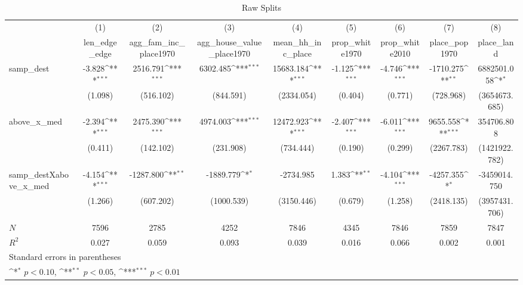 \begin{table}[htbp]\centering
\def\sym#1{\ifmmode^{#1}\else\(^{#1}\)\fi}
\caption{Raw Splits}
\begin{tabular}{l*{8}{c}}
\hline\hline
            &\multicolumn{1}{c}{(1)}&\multicolumn{1}{c}{(2)}&\multicolumn{1}{c}{(3)}&\multicolumn{1}{c}{(4)}&\multicolumn{1}{c}{(5)}&\multicolumn{1}{c}{(6)}&\multicolumn{1}{c}{(7)}&\multicolumn{1}{c}{(8)}\\
            &\multicolumn{1}{c}{len\_edge\_edge}&\multicolumn{1}{c}{agg\_fam\_inc\_place1970}&\multicolumn{1}{c}{agg\_house\_value\_place1970}&\multicolumn{1}{c}{mean\_hh\_inc\_place}&\multicolumn{1}{c}{prop\_white1970}&\multicolumn{1}{c}{prop\_white2010}&\multicolumn{1}{c}{place\_pop1970}&\multicolumn{1}{c}{place\_land}\\
\hline
samp\_dest   &      -3.828\sym{***}&    2516.791\sym{***}&    6302.485\sym{***}&   15683.184\sym{***}&      -1.125\sym{***}&      -4.746\sym{***}&   -1710.275\sym{**} & 6882501.058\sym{*}  \\
            &     (1.098)         &   (516.102)         &   (844.591)         &  (2334.054)         &     (0.404)         &     (0.771)         &   (728.968)         &(3654673.685)         \\
[1em]
above\_x\_med &      -2.394\sym{***}&    2475.390\sym{***}&    4974.003\sym{***}&   12472.923\sym{***}&      -2.407\sym{***}&      -6.011\sym{***}&    9655.558\sym{***}&  354706.808         \\
            &     (0.411)         &   (142.102)         &   (231.908)         &   (734.444)         &     (0.190)         &     (0.299)         &  (2267.783)         &(1421922.782)         \\
[1em]
samp\_destXabove\_x\_med&      -4.154\sym{***}&   -1287.800\sym{**} &   -1889.779\sym{*}  &   -2734.985         &       1.383\sym{**} &      -4.104\sym{***}&   -4257.355\sym{*}  &-3459014.750         \\
            &     (1.266)         &   (607.202)         &  (1000.539)         &  (3150.446)         &     (0.679)         &     (1.258)         &  (2418.135)         &(3957431.706)         \\
\hline
\(N\)       &        7596         &        2785         &        4252         &        7846         &        4345         &        7846         &        7859         &        7847         \\
\(R^{2}\)   &       0.027         &       0.059         &       0.093         &       0.039         &       0.016         &       0.066         &       0.002         &       0.001         \\
\hline\hline
\multicolumn{9}{l}{\footnotesize Standard errors in parentheses}\\
\multicolumn{9}{l}{\footnotesize \sym{*} \(p<0.10\), \sym{**} \(p<0.05\), \sym{***} \(p<0.01\)}\\
\end{tabular}
\end{table}
